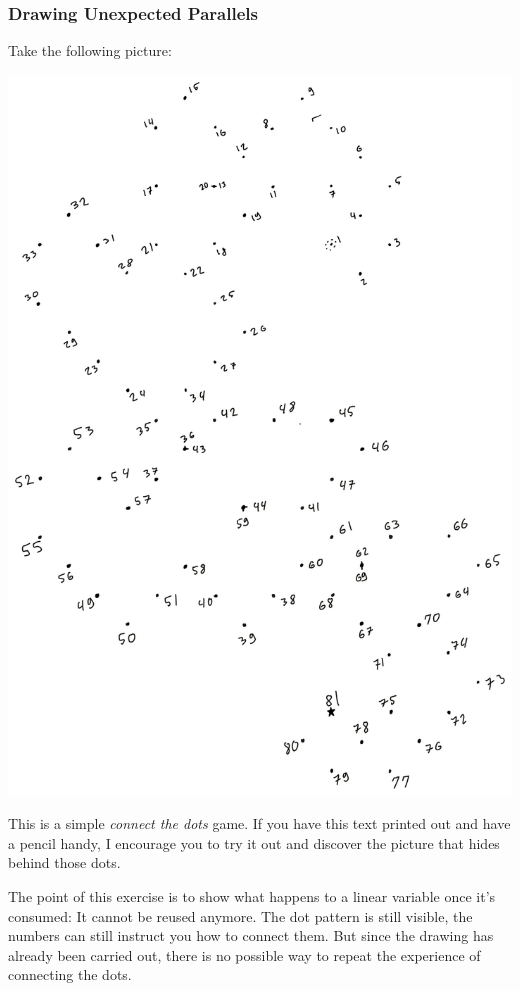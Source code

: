 \documentclass[
]{article}
\begin{document}
\newpage

\hypertarget{drawing-unexpected-parallels}{%
\subsubsection{Drawing Unexpected
Parallels}\label{drawing-unexpected-parallels}}

Take the following picture:

\includegraphics{A1AB5AFB-31BB-4E50-ABBE-7EDE8D4CA146.png}

This is a simple \emph{connect the dots} game. If you have this text
printed out and have a pencil handy, I encourage you to try it out and
discover the picture that hides behind those dots.

The point of this exercise is to show what happens to a linear variable
once it's consumed: It cannot be reused anymore. The dot pattern is
still visible, the numbers can still instruct you how to connect them.
But since the drawing has already been carried out, there is no possible
way to repeat the experience of connecting the dots.
\end{document}
